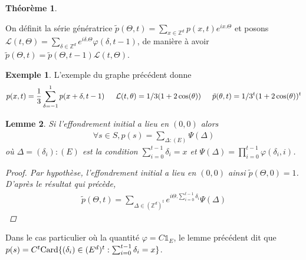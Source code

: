 \documentclass{article}
\newtheorem{theorem}{Théorème}[section]
\newtheorem{lemma}[theorem]{Lemme}
\theoremstyle{definition}
\newtheorem{exmp}{Exemple}[section]
\begin{document}
\begin{theorem}
\end{theorem}
On définit la série génératrice $\tilde{p}(\Theta, t) = \sum_{x\in \mathbb{Z}^d}p(x,t)e^{i x.\Theta}$ et posons $\mathcal{L}(t,\Theta)= \sum_{\delta\in \mathbb{Z}^d} e^{i\delta.\Theta}\varphi(\delta,t-1)$, de manière à avoir 
$\tilde{p}(\Theta, t) = \tilde{p}(\Theta, t-1)\mathcal{L}(t,\Theta)$.
\begin{exmp}
	L'exemple du graphe précédent donne 
	\begin{align*}
		p(x, t) = \frac{1}{3}\sum_{\delta=-1}^1 p(x+\delta, t-1)\indent \mathcal{L}(t,\theta) = 1/3(1+2\cos(\theta)) \indent \tilde{p}(\theta, t) = 1/3^t(1+2\cos(\theta))^t
	\end{align*}
\end{exmp}
	\begin{lemma}
	Si l'effondrement initial a lieu en $(0,0)$ alors
	\begin{align*}
		\forall s\in S, p(s) = \sum_{\Delta : (E)}  \Psi(\Delta)
	\end{align*}
	où $\Delta = (\delta_i) : (E)$ est la condition $\sum_{i=0}^{t-1}\delta_{i} = x$ et $\Psi(\Delta) = \prod_{i=0}^{t-1}\varphi(\delta_i,i)$.
	\begin{proof}
		Par hypothèse, l'effondrement initial a lieu en $(0,0)$ ainsi $\tilde{p}(\Theta, 0) = 1$. D'après le résultat qui précède, 
		\begin{align*} \tilde{p}(\Theta, t) = %
		\sum_{\Delta\in (\mathbb{Z}^d)^{t}} e^{i\Theta.\sum_{i=0}^{t-1} \delta_i}\Psi(\Delta)\end{align*}
	\end{proof}\end{lemma}
	Dans le cas particulier où la quantité $\varphi=C\mathds{1}_E$, le lemme précédent dit que $p(s) = C^t\textup{Card}\{(\delta_i)\in (E^d)^t : \sum_{i=0}^{t-1}\delta_i=x\}$. %
\end{document}

